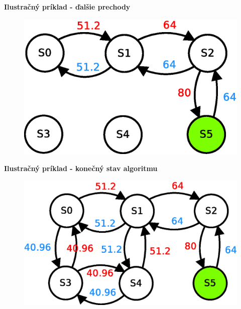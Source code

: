 \documentclass[xcolor=dvipsnames]{beamer}
\begin{document}
\begin{frame}{\bf Ilustračný príklad - ďalšie prechody}

\begin{figure}[!htb]
\includegraphics[scale=.5]{../diagrams/q_learning_table_05.eps}
\end{figure}

\end{frame}

\begin{frame}{\bf Ilustračný príklad - konečný stav algoritmu}

\begin{figure}[!htb]
\includegraphics[scale=.5]{../diagrams/q_learning_table_06.eps}
\end{figure}

\end{frame}
\end{document}
